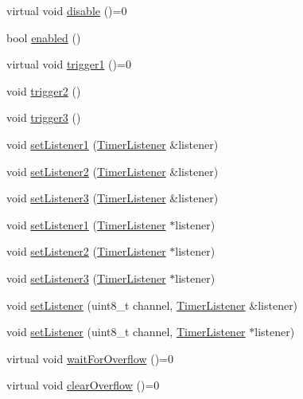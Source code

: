 \begin{DoxyCompactItemize}
\item 
virtual void \hyperlink{classflame_1_1_timer_ae8aad2641dffe007a8e48e78d9c08dd2}{disable} ()=0
\item 
bool \hyperlink{classflame_1_1_timer_adafe1171cc542d5d76a997593c57b25c}{enabled} ()
\item 
virtual void \hyperlink{classflame_1_1_timer_a93bdf45d9aadea6694dea8ef236e8725}{trigger1} ()=0
\item 
void \hyperlink{classflame_1_1_timer_a0cbf27eaf4ed9b9ea9f43ad04e868f1a}{trigger2} ()
\item 
void \hyperlink{classflame_1_1_timer_ac3b55b8cb98dc81e8dec5bb01fee6d4c}{trigger3} ()
\item 
void \hyperlink{classflame_1_1_timer_a01c6c9e054e425c684a164c50b702b4e}{set\-Listener1} (\hyperlink{classflame_1_1_timer_listener}{Timer\-Listener} \&listener)
\item 
void \hyperlink{classflame_1_1_timer_a1c0ca577b10fe85ed51d8159cd8579dc}{set\-Listener2} (\hyperlink{classflame_1_1_timer_listener}{Timer\-Listener} \&listener)
\item 
void \hyperlink{classflame_1_1_timer_a0f9696bf191e48f7dfbc81f8147117e0}{set\-Listener3} (\hyperlink{classflame_1_1_timer_listener}{Timer\-Listener} \&listener)
\item 
void \hyperlink{classflame_1_1_timer_aa0f3fa5e1ee6d4e4585ef1eabef75edf}{set\-Listener1} (\hyperlink{classflame_1_1_timer_listener}{Timer\-Listener} $\ast$listener)
\item 
void \hyperlink{classflame_1_1_timer_a3d8738555886bd7363e068576386bd8d}{set\-Listener2} (\hyperlink{classflame_1_1_timer_listener}{Timer\-Listener} $\ast$listener)
\item 
void \hyperlink{classflame_1_1_timer_a7255c3c68fd6b215017b3454934b3033}{set\-Listener3} (\hyperlink{classflame_1_1_timer_listener}{Timer\-Listener} $\ast$listener)
\item 
void \hyperlink{classflame_1_1_timer_a65a79e68a325a494f13702091b40b714}{set\-Listener} (uint8\-\_\-t channel, \hyperlink{classflame_1_1_timer_listener}{Timer\-Listener} \&listener)
\item 
void \hyperlink{classflame_1_1_timer_aa9a1b254a56cad13b623a4ca6453d0dc}{set\-Listener} (uint8\-\_\-t channel, \hyperlink{classflame_1_1_timer_listener}{Timer\-Listener} $\ast$listener)
\item 
virtual void \hyperlink{classflame_1_1_timer_a79db91c2c457766ae8b4dd01d5caf7e4}{wait\-For\-Overflow} ()=0
\item 
virtual void \hyperlink{classflame_1_1_timer_a84e3f3f1fdfe90a8b247ee6b15b43c89}{clear\-Overflow} ()=0
\end{DoxyCompactItemize}
